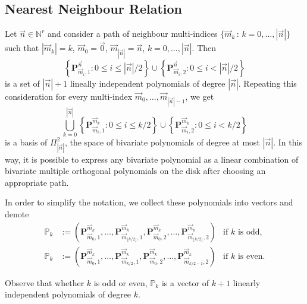 \documentclass[a4paper]{article}
\theoremstyle{plain}
\theoremstyle{definition}
\newcommand{\NN}{\mathbb{N}}
\begin{document}
    \subsection{Nearest Neighbour Relation}
    
    Let $\vec n\in\NN^r$ and consider a path of neighbour multi-indices $\{\vec m_k \,:\, k=0,\dots,|\vec n| \}$ such that $ |\vec m_k|=k$, $\vec m_0 = \vec 0$, $\vec m_{|\vec n|}=\vec n$, $k=0,\dots,|\vec n|$.  
    Then
    \begin{equation}
        \label{eq:basis-MOP-n}
        \left\{\mathbf P_{\vec m_i,1}^{\vec n}: 0\leq i\leq |\vec n|/2\right\}\cup\left\{\mathbf P_{\vec m_i,2}^{\vec n}: 0\leq i< |\vec n|/2\right\}
    \end{equation}
    is a set of $|\vec n|+1$ lineally independent polynomials of degree $|\vec n|$. Repeating this consideration for every multi-index $\vec m_0,\dots,\vec m_{|\vec n|-1}$, we get
    \begin{equation}
        \label{eq:basis-MOP}
        \bigcup_{k=0}^{|\vec n|}\left\{\mathbf P_{\vec m_i,1}^{\vec m_k}: 0\leq i\leq k/2\right\}\cup\left\{\mathbf P_{\vec m_i,2}^{\vec m_k}: 0\leq i< k/2\right\}
    \end{equation}
    is a basis of $\Pi_{|\vec n|}^2$, the space of bivariate polynomials of degree at most $|\vec n|$. In this way, it is possible to express any bivariate polynomial as a linear combination of bivariate multiple orthogonal polynomials on the disk after choosing an appropriate path.
    
    In order to simplify the notation, we collect these polynomials into vectors and denote 
    \begin{equation}
    \label{eq:polynomial-vector-MOP}
    \begin{aligned}
        \mathbb P_{k} &:= \left(\mathbf P_{\vec m_0,1}^{\vec m_k},\dots,\mathbf P_{\vec m_{\lfloor k/2\rfloor },1}^{\vec m_k},\mathbf P_{\vec m_0,2}^{\vec m_k},\dots,\mathbf P_{\vec m_{\lfloor k/2\rfloor},2}^{\vec m_k}\right)& \text{if }k\text{ is odd,}\\
        \mathbb P_{k} &:= \left(\mathbf P_{\vec m_0,1}^{\vec m_k},\dots,\mathbf P_{\vec m_{k/2},1}^{\vec m_k},\mathbf P_{\vec m_0,2}^{\vec m_k},\dots,\mathbf P_{\vec m_{k/2-1},2}^{\vec m_k}\right)& \text{if }k\text{ is even.}
    \end{aligned}
    \end{equation}
    
    Observe that whether $k$ is odd or even, $\mathbb P_k$ is a vector of $k+1$ linearly independent polynomials of degree $k$.\\
\end{document}
